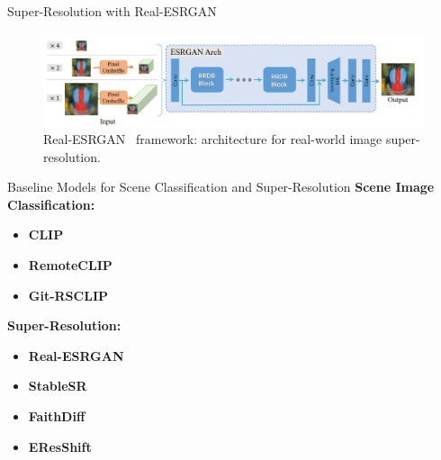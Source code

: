   \begin{refsection}
  \begin{frame}{Super-Resolution with Real-ESRGAN}
    \begin{figure}
      \centering
      \includegraphics[width=\linewidth]{figs/realesrgan.png}
      \caption{\scriptsize Real-ESRGAN~\parencite{wangRealESRGANTrainingRealWorld2021b} framework: architecture for real-world image super-resolution.}
    \end{figure}
    \bottomleftrefs
  \end{frame}
  \end{refsection}

  
\begin{refsection}
  \begin{frame}{Baseline Models for Scene Classification and Super-Resolution}
    \textbf{Scene Image Classification:}
    \begin{itemize}
      \item \textbf{CLIP}~\parencite{radfordLearningTransferableVisual2021}
      \item \textbf{RemoteCLIP}~\parencite{liuRemoteCLIPVisionLanguage2024}
      \item \textbf{Git-RSCLIP}~\parencite{text2earth2025}
    \end{itemize}
    \textbf{Super-Resolution:}
    \begin{itemize}
      \item \textbf{Real-ESRGAN}~\parencite{wangRealESRGANTrainingRealWorld2021b}
      \item \textbf{StableSR}~\parencite{wangExploitingDiffusionPrior2024}
      \item \textbf{FaithDiff}~\parencite{chenFaithDiffUnleashingDiffusion2024}
      \item \textbf{EResShift}~\parencite{yueEfficientDiffusionModel2025}
    \end{itemize}
    \bottomleftrefs
  \end{frame}
  \end{refsection}

